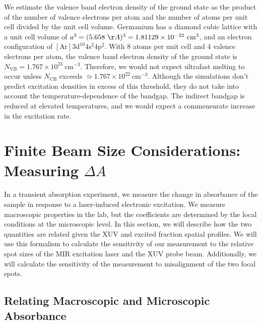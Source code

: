 We estimate the valence band electron density of the ground state as the product of the number of valence electrons per atom and the number of atoms per unit cell divided by the unit cell volume. Germanium has a diamond cubic lattice with a unit cell volume of ${a^3 = (5.658 \ \AA)^3 = 1.81129 \times 10^{-22} \ \textrm{cm}^3}$, and an electron configuration of ${[\textrm{Ar}] 3\textrm{d}^{10 }4\textrm{s}^2 4\textrm{p}^2}$. With 8 atoms per unit cell and 4 valence electrons per atom, the valence band electron density of the ground state is $N_{\textrm{VB}} = 1.767 \times 10^{23} \ \textrm{cm}^{-3}$. Therefore, we would not expect ultrafast melting to occur unless $N_{\textrm{CB}}$ exceeds $\simeq 1.767 \times 10^{22} \ \textrm{cm}^{-3}$. Although the simulations don't predict excitation densities in excess of this threshold, they do not take into account the temperature-dependence of the bandgap. The indirect bandgap is reduced at elevated temperatures, and we would expect a commensurate increase in the excitation rate.

\section{Finite Beam Size Considerations: Measuring $\Delta A$}
\label{sec:finite_beam_size}

In a transient absorption experiment, we measure the change in absorbance of the sample in response to a laser-induced electronic excitation. We measure macroscopic properties in the lab, but the coefficients are determined by the local conditions at the microscopic level. In this section, we will describe how the two quantities are related given the XUV and excited fraction spatial profiles. We will use this formalism to calculate the sensitivity of our measurement to the relative spot sizes of the MIR excitation laser and the XUV probe beam. Additionally, we will calculate the sensitivity of the measurement to misalignment of the two focal spots.

\subsection{Relating Macroscopic and Microscopic Absorbance}
\label{sec:micro_macro_DeltaA}


